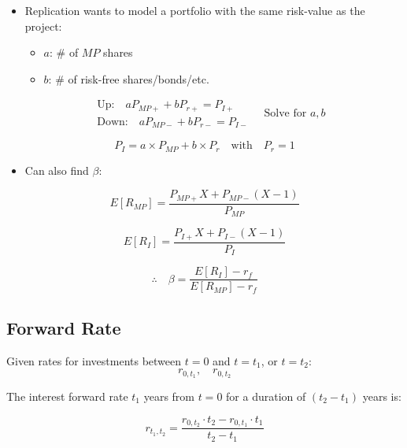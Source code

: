 \begin{definition}

    \begin{itemize}
        \item Replication wants to model a portfolio with the same risk-value as the project:
            \begin{itemize}
                \item $a$: \# of $MP$ shares
                \item $b$: \# of risk-free shares/bonds/etc.
            \end{itemize}
    \end{itemize}
    
    \begin{equation*}
        \begin{aligned}
            &\text{Up:} \quad a P_{MP+} + b P_{r+} = P_{I+} \\
            &\text{Down:} \quad a P_{MP-} + b P_{r-} = P_{I-}
        \end{aligned}
        \quad \text{Solve for } a, b
    \end{equation*}
    
    \[
    P_I = a \times P_{MP} + b \times P_r \quad \text{with} \quad P_r = 1
    \]
    
    \begin{itemize}
        \item Can also find $\beta$:
    \end{itemize}
    
    \[
    E[R_{MP}] = \frac{P_{MP+} X + P_{MP-} (X-1)}{P_{MP}}
    \]
    
    \[
    E[R_I] = \frac{P_{I+} X + P_{I-} (X-1)}{P_I}
    \]
    
    \[
    \therefore \quad \beta = \frac{E[R_I] - r_f}{E[R_{MP}] - r_f}
    \]

\end{definition}

\subsection{Forward Rate}
\begin{definition}
    Given rates for investments between $t=0$ and $t=t_1$, or $t=t_2$:
    \[
    r_{0,t_1}, \quad r_{0,t_2}
    \]

    \noindent The interest forward rate $t_1$ years from $t=0$ for a duration of $(t_2 - t_1)$ years is:
    
    \begin{equation}
        r_{t_1,t_2} = \frac{r_{0,t_2} \cdot t_2 - r_{0,t_1} \cdot t_1}{t_2 - t_1}
    \end{equation}            
\end{definition}

